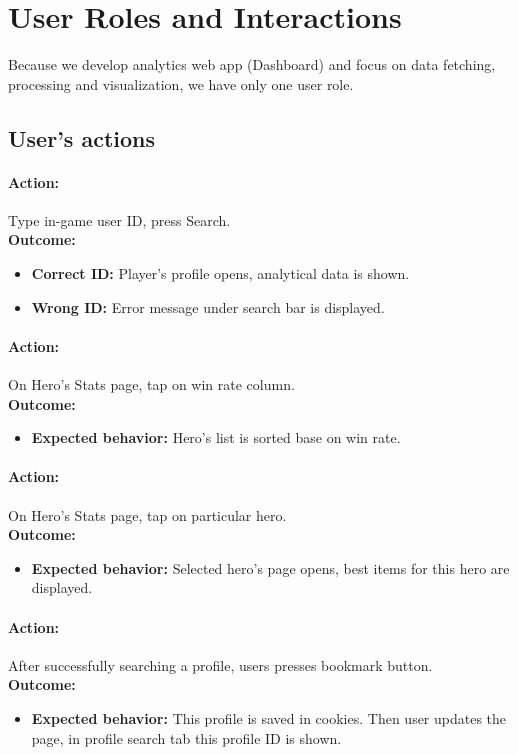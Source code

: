 \section{User Roles and Interactions}
Because we develop analytics web app (Dashboard) and focus on data fetching, processing and visualization,
we have only one user role.

\subsection{User's actions}

\paragraph{Action:} Type in-game user ID, press Search.
\\
\textbf{Outcome:}
    \begin{itemize}
        \item \textbf{Correct ID:} Player’s profile opens, analytical data is shown.
        \item \textbf{Wrong ID:} Error message under search bar is displayed.
    \end{itemize}



\paragraph{Action:} On Hero's Stats page, tap on win rate column.
\\
\textbf{Outcome:}
    \begin{itemize}
        \item \textbf{Expected behavior:}  Hero's list is sorted base on win rate.
    \end{itemize}

\paragraph{Action:} On Hero's Stats page, tap on particular hero.
\\
\textbf{Outcome:}
\begin{itemize}
    \item \textbf{Expected behavior:} Selected hero's page opens, best items for this hero are displayed.
\end{itemize}

\paragraph{Action:} After successfully searching a profile, users presses bookmark button.
\\
\textbf{Outcome:}
\begin{itemize}
    \item \textbf{Expected behavior:} This profile is saved in cookies.
    Then user updates the page, in profile search tab this profile ID is shown.
\end{itemize}